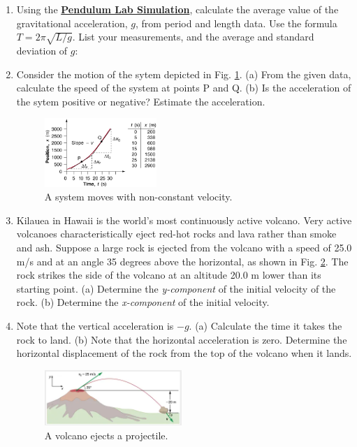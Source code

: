 \documentclass{article}
\begin{document}
\begin{enumerate}
\item Using the \textbf{\href{https://phet.colorado.edu/en/simulations/pendulum-lab}{Pendulum Lab Simulation}}, calculate the average value of the gravitational acceleration, $g$, from period and length data.  Use the formula $T = 2\pi\sqrt{L/g}$. List your measurements, and the average and standard deviation of $g$: \\ \vspace{4cm}

\item Consider the motion of the sytem depicted in Fig. \ref{fig:1}.  (a) From the given data, calculate the speed of the system at points P and Q. (b) Is the acceleration of the sytem positive or negative?  Estimate the acceleration. \\ \vspace{3cm}

\begin{figure}
\centering
\includegraphics[width=0.4\textwidth]{slope2.jpeg}
\caption{\label{fig:1} A system moves with non-constant velocity.}
\end{figure}

\item Kilauea in Hawaii is the world's most continuously active volcano. Very active volcanoes characteristically eject red-hot rocks and lava rather than smoke and ash. Suppose a large rock is ejected from the volcano with a speed of 25.0 m/s and at an angle 35 degrees above the horizontal, as shown in Fig. \ref{fig:2}. The rock strikes the side of the volcano at an altitude 20.0 m lower than its starting point. (a) Determine the \textit{y-component} of the initial velocity of the rock.  (b) Determine the \textit{x-component} of the initial velocity. \\ \vspace{2cm}
\item Note that the vertical acceleration is $-g$. (a) Calculate the time it takes the rock to land. (b) Note that the horizontal acceleration is zero.  Determine the horizontal displacement of the rock from the top of the volcano when it lands. \\ \vspace{3cm}

\begin{figure}
\centering
\includegraphics[width=0.49\textwidth]{volcano.png}
\caption{\label{fig:2} A volcano ejects a projectile.}
\end{figure}

\end{enumerate}
\end{document}
